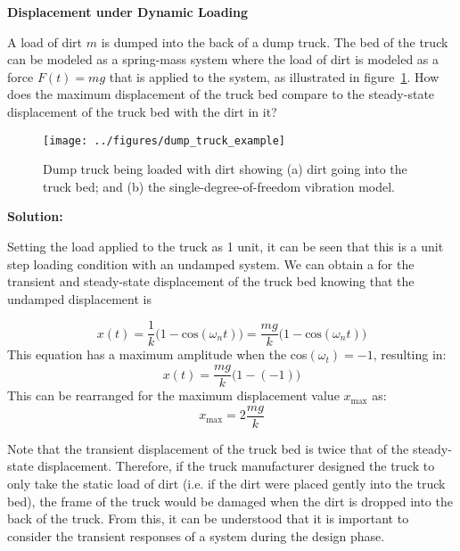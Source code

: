 \documentclass[12pt,letter]{article}
\begin{document}
\begin{example}

		\textbf{Displacement under Dynamic Loading}

		\noindent A load of dirt $m$ is dumped into the back of a dump truck. The bed of the truck can be modeled as a spring-mass system where the load of dirt is modeled as a force $F(t) = m g$ that is applied to the system, as illustrated in figure~\ref{fig:dump_truck_example}. How does the maximum displacement of the truck bed compare to the steady-state displacement of the truck bed with the dirt in it?

\begin{figure}[H]
	\centering
	\texttt{[image: ../figures/dump\_truck\_example]}
	\caption{Dump truck being loaded with dirt showing (a) dirt going into the truck bed\protect\footnotemark[1]; and (b) the single-degree-of-freedom vibration model.  }
	\label{fig:dump_truck_example}
\end{figure}

\noindent\textbf{Solution:} 

\noindent Setting the load applied to the truck as 1 unit, it can be seen that this is a unit step loading condition with an undamped system. We can obtain a for the transient and steady-state displacement of the truck bed knowing that the undamped displacement is

\begin{equation}
	x(t) = \frac{1}{k}\big(1-\text{cos}(\omega_n t)\big) = \frac{m g}{k}\big(1-\text{cos}(\omega_n t)\big)
\end{equation}
This equation has a maximum amplitude when the cos$(\omega_t)=-1$, resulting in:
\begin{equation}
	x(t) = \frac{m g}{k}\big(1-(-1)\big)
\end{equation}
This can be rearranged for the maximum displacement value $x_\text{max} $ as:
\begin{equation}
	x_\text{max} = 2\frac{m g}{k}
\end{equation} 

Note that the transient displacement of the truck bed is twice that of the steady-state displacement. Therefore, if the truck manufacturer designed the truck to only take the static load of dirt (i.e. if the dirt were placed gently into the truck bed), the frame of the truck would be damaged when the dirt is dropped into the back of the truck. From this, it can be understood that it is important to consider the transient responses of a system during the design phase.


\end{example}
\end{document}
